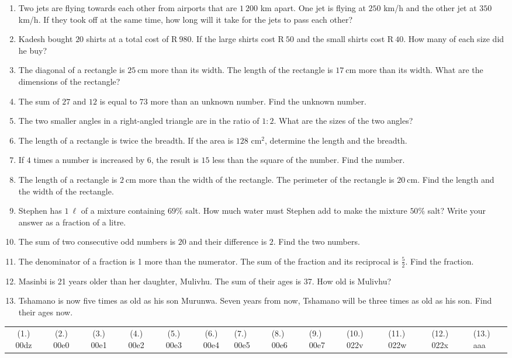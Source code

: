 \begin{exercises}{}
{
\begin{enumerate}[noitemsep, label=\textbf{\arabic*}. ] 
\item Two jets are flying towards each other from airports that are $1~200$ km apart. One jet is flying at $250$ km/h and the other jet at $350$ km/h. If they took off at the same time, how long will it take for the jets to pass each other?
\item Kadesh bought $20$ shirts at a total cost of R$~980$. If the
  large shirts cost R$~50$ and the small shirts cost R$~40$. How many
  of each size did he buy?
\item The diagonal of a rectangle is $25~$cm more than its width. The length of the rectangle is $17~$cm more than its width. What are the dimensions of the rectangle?  
\item The sum of $27$ and $12$ is equal to $73$ more than an unknown number. Find the unknown number.
\item The two smaller angles in a right-angled triangle are in the ratio of $1:2$. What are the sizes of the two angles? 
\item The length of a rectangle is twice the breadth. If the area is $128$ cm$^{2}$, determine the length and the breadth.       
\item If $4$ times a number is increased by $6$, the result is $15$ less than the square of the number. Find the number.
\item The length of a rectangle is $2~$cm more than the width of the rectangle. The perimeter of the rectangle is $20~$cm. Find the length and the width of the rectangle.
\item Stephen has $1~\ell{}$ of a mixture containing $69\%$ salt. How much water must Stephen add to make the mixture $50\%$ salt? Write your answer as a fraction of a litre.
\item The sum of two consecutive odd numbers is $20$ and their difference is $2$. Find the two numbers. 
\item The denominator of a fraction is 1 more than the numerator. The sum of the fraction and its reciprocal is $\frac{5}{2}$. Find the fraction.
\item Masinbi is 21 years older than her daughter, Mulivhu. The sum of their ages is 37. How old is Mulivhu? 
\item Tshamano is now five times as old as his son Murunwa. Seven years from now, Tshamano will be three times as old as his son. Find their ages now.    
\end{enumerate}
\practiceinfo
\par 
\par \begin{tabular}[h]{cccccc}
(1.) 00dz&  (2.) 00e0&  (3.) 00e1&  (4.) 00e2&  (5.) 00e3&  (6.) 00e4&  (7.) 00e5& (8.) 00e6& (9.) 00e7 & (10.) 022v & (11.) 022w & (12.) 022x & (13.) aaa\end{tabular}
}
\end{exercises}

